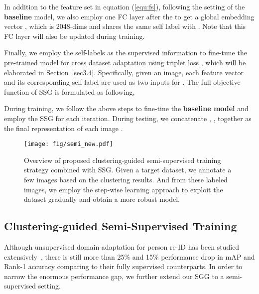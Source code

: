 \documentclass[10pt,twocolumn,letterpaper]{article}
\begin{document}
In addition to the feature set in equation (\ref{equ:fs}), following the setting of the {\bf baseline} model, we also employ one FC layer after the  to get a global embedding vector , which is 2048-dims and shares the same self label with . Note that this FC layer will also be updated during training.

Finally, we employ the self-labels as the supervised information to fine-tune the pre-trained model for cross dataset adaptation using triplet loss , which will be elaborated in Section~\ref{sec3.4}. Specifically, given an image, each feature vector and its corresponding self-label are used as two inputs for . The full objective function of SSG is formulated as following, 



 
During training, we follow the above steps to fine-tine the {\bf baseline model} and employ the SSG for each iteration. During testing, we concatenate , ,  together as the final representation of each image .

\begin{figure}[t]
	\centering
	\texttt{[image: fig/semi\_new.pdf]}
	\caption{Overview of proposed clustering-guided semi-supervised training strategy combined with SSG. Given a target dataset, we annotate a few images based on the clustering results. And from these labeled images, we employ the step-wise learning approach to exploit the dataset gradually and obtain a more robust model.}
	\label{fig:semi}
	\vspace{-3mm}
\end{figure}

\subsection{Clustering-guided Semi-Supervised Training} \label{sec3.3}

Although unsupervised domain adaptation for person re-ID has been studied extensively~\cite{deng2018image,wei2017person,wang2018transferable,zhong2018generalizing}, there is still more than 25\% and 15\% performance drop in mAP and Rank-1 accuracy comparing to their fully supervised counterparts. In order to narrow the enormous performance gap, we further extend our SGG to a semi-supervised setting.
\end{document}
